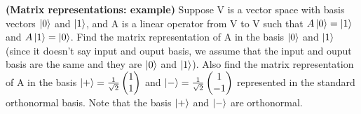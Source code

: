 \begin{example}
\textbf{(Matrix representations: example)}
    Suppose V is a vector space with basis vectors $\ket{0}$ and $\ket{1}$, and A is a linear operator from
    V to V such that $A\ket{0}=\ket{1}$ and $A\ket{1}=\ket{0}$. Find the matrix representation of A in the basis $\ket{0}$ and $\ket{1}$ 
    (since it doesn't say input and ouput basis, we assume that the input and ouput basis are the same and they are $\ket{0}$ and $\ket{1}$).
    Also find the matrix representation of A in the basis $\ket{+}=\frac{1}{\sqrt{2}}\begin{pmatrix} 1 \\ 1 \end{pmatrix}$ and $\ket{-}=\frac{1}{\sqrt{2}}\begin{pmatrix} 1 \\ -1 \end{pmatrix}$
    represented in the standard orthonormal basis. Note that the basis $\ket{+}$ and $\ket{-}$ are orthonormal.


\end{example}
